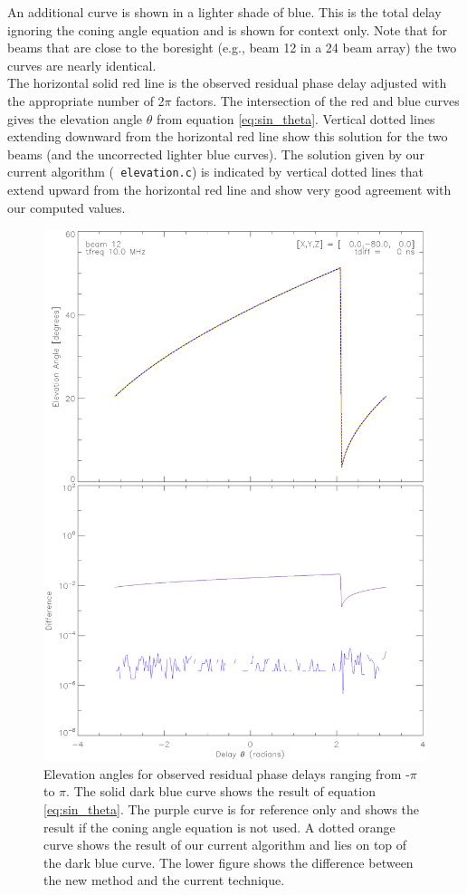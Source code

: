 \documentclass{article}
\begin{document}
\noindent
An additional curve is shown in a lighter shade of blue. This is the total
delay ignoring the coning angle equation and is shown for context only. Note
that for beams that are close to the boresight (e.g., beam 12 in a 24 beam
array) the two curves are nearly identical. \\

\noindent
The horizontal solid red line is the observed residual phase delay adjusted
with the appropriate number of 2$\pi$ factors. The intersection of the red
and blue curves gives the elevation angle $\theta$ from equation
\ref{eq:sin_theta}. Vertical dotted lines extending downward from the
horizontal red line show this solution for the two beams (and the uncorrected
lighter blue curves). The solution given by our current algorithm ({\tt
elevation.c}) is indicated by vertical dotted lines that extend upward from the
horizontal red line and show very good agreement with our computed values.\\

\begin{figure}[tb]
\includegraphics[scale=.8]{beam12_eg.ps}
\caption{Elevation angles for observed residual phase delays ranging from
-$\pi$ to $\pi$. The solid dark blue curve shows the result of equation
\ref{eq:sin_theta}. The purple curve is for reference only and shows the
result if the coning angle equation is not used. A dotted orange curve shows
the result of our current algorithm and lies on top of the dark blue curve.
The lower figure shows the difference between the new method and the current
technique.}
\label{fig:beam12}
\end{figure}
\end{document}
